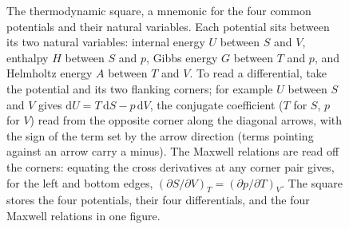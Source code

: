 \begin{figure}[htbp]
\centering
{}
\caption[The thermodynamic square]{The thermodynamic square, a mnemonic for
the four common potentials and their natural variables. Each potential sits
between its two natural variables: internal energy $U$ between $S$ and $V$,
enthalpy $H$ between $S$ and $p$, Gibbs energy $G$ between $T$ and $p$, and
Helmholtz energy $A$ between $T$ and $V$. To read a differential, take the
potential and its two flanking corners; for example $U$ between $S$ and $V$
gives $\mathrm{d}U = T\,\mathrm{d}S - p\,\mathrm{d}V$, the conjugate
coefficient ($T$ for $S$, $p$ for $V$) read from the opposite corner along the
diagonal arrows, with the sign of the term set by the arrow direction (terms
pointing against an arrow carry a minus). The Maxwell relations are read off
the corners: equating the cross derivatives at any corner pair gives, for the
left and bottom edges, $(\partial S/\partial V)_T = (\partial p/\partial T)_V$.
The square stores the four potentials, their four differentials, and the four
Maxwell relations in one figure.}
\label{fig:vol04ch01:maxwell-square}
\end{figure}
